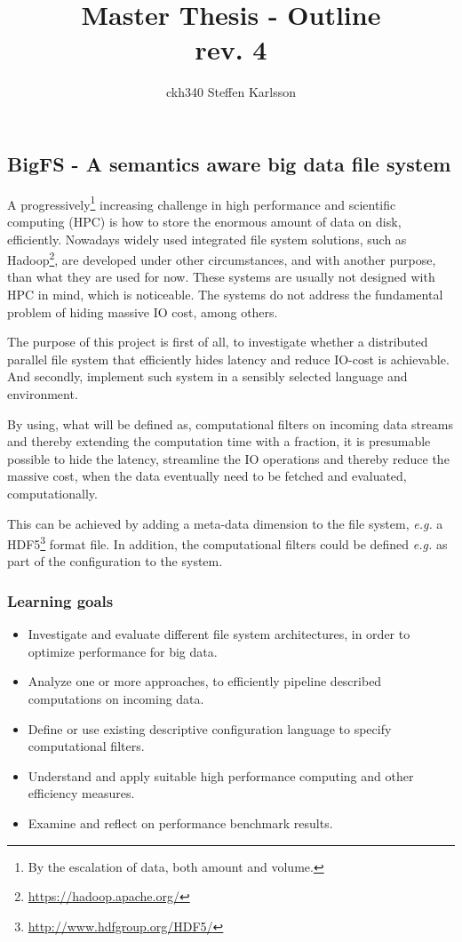 \documentclass[12pt,a4paper]{article}
\author{ckh340 Steffen Karlsson}
\title{Master Thesis - Outline \\ \small{rev. 4}}
\begin{document}
\maketitle

\subsection*{BigFS - A semantics aware big data file system}

A progressively\footnote{By the escalation of data, both amount and volume.} increasing challenge in high performance and scientific computing (HPC) is how to store the enormous amount of data on disk, efficiently. Nowadays widely used integrated file system solutions, such as Hadoop\footnote{\url{https://hadoop.apache.org/}}, are developed under other circumstances, and with another purpose, than what they are used for now. These systems are usually not designed with HPC in mind, which is noticeable. The systems do not address the fundamental problem of hiding massive IO cost, among others.
\newline

The purpose of this project is first of all, to investigate whether a distributed parallel file system that efficiently hides latency and reduce IO-cost is achievable. And secondly, implement such system in a sensibly selected language and environment. 
\newline

By using, what will be defined as, computational filters on incoming data streams and thereby extending the computation time with a fraction, it is presumable possible to hide the latency, streamline the IO operations and thereby reduce the massive cost, when the data eventually need to be fetched and evaluated, computationally. 
\newline

This can be achieved by adding a meta-data dimension to the file system, \textit{e.g.} a HDF5\footnote{\url{http://www.hdfgroup.org/HDF5/}} format file. In addition, the computational filters could be defined \textit{e.g.} as part of the configuration to the system.

\newpage
\subsubsection*{Learning goals}
\vspace{3mm}
\begin{itemize}
	\item Investigate and evaluate different file system architectures, in order to optimize performance for big data.	
	\item Analyze one or more approaches, to efficiently pipeline described computations on incoming data.
	\item Define or use existing descriptive configuration language to specify computational filters.
	\item Understand and apply suitable high performance computing and other efficiency measures.
	\item Examine and reflect on performance benchmark results.
\end{itemize}
\end{document}
